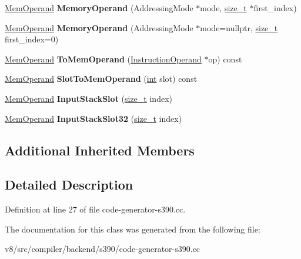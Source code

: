 \begin{DoxyCompactItemize}
\mbox{\hyperlink{classv8_1_1internal_1_1MemOperand}{Mem\+Operand}} {\bfseries Memory\+Operand} (Addressing\+Mode $\ast$mode, \mbox{\hyperlink{classsize__t}{size\+\_\+t}} $\ast$first\+\_\+index)
\item 
\mbox{\label{classv8_1_1internal_1_1compiler_1_1S390OperandConverter_af0426131990efbe82155d38d19bcee54}} 
\mbox{\hyperlink{classv8_1_1internal_1_1MemOperand}{Mem\+Operand}} {\bfseries Memory\+Operand} (Addressing\+Mode $\ast$mode=nullptr, \mbox{\hyperlink{classsize__t}{size\+\_\+t}} first\+\_\+index=0)
\item 
\mbox{\label{classv8_1_1internal_1_1compiler_1_1S390OperandConverter_a9cab6e41a34bd39ad239f9eba487e5f2}} 
\mbox{\hyperlink{classv8_1_1internal_1_1MemOperand}{Mem\+Operand}} {\bfseries To\+Mem\+Operand} (\mbox{\hyperlink{classv8_1_1internal_1_1compiler_1_1InstructionOperand}{Instruction\+Operand}} $\ast$op) const
\item 
\mbox{\label{classv8_1_1internal_1_1compiler_1_1S390OperandConverter_a709a38f316c6baf1e2916c6552941f45}} 
\mbox{\hyperlink{classv8_1_1internal_1_1MemOperand}{Mem\+Operand}} {\bfseries Slot\+To\+Mem\+Operand} (\mbox{\hyperlink{classint}{int}} slot) const
\item 
\mbox{\label{classv8_1_1internal_1_1compiler_1_1S390OperandConverter_a6146df71f6d40644ae4412e7e00e5694}} 
\mbox{\hyperlink{classv8_1_1internal_1_1MemOperand}{Mem\+Operand}} {\bfseries Input\+Stack\+Slot} (\mbox{\hyperlink{classsize__t}{size\+\_\+t}} index)
\item 
\mbox{\label{classv8_1_1internal_1_1compiler_1_1S390OperandConverter_a22bcf97b7a90751e2cedaf1e0907db4e}} 
\mbox{\hyperlink{classv8_1_1internal_1_1MemOperand}{Mem\+Operand}} {\bfseries Input\+Stack\+Slot32} (\mbox{\hyperlink{classsize__t}{size\+\_\+t}} index)
\end{DoxyCompactItemize}
\subsection*{Additional Inherited Members}


\subsection{Detailed Description}


Definition at line 27 of file code-\/generator-\/s390.\+cc.



The documentation for this class was generated from the following file\+:\begin{DoxyCompactItemize}
\item 
v8/src/compiler/backend/s390/code-\/generator-\/s390.\+cc\end{DoxyCompactItemize}
